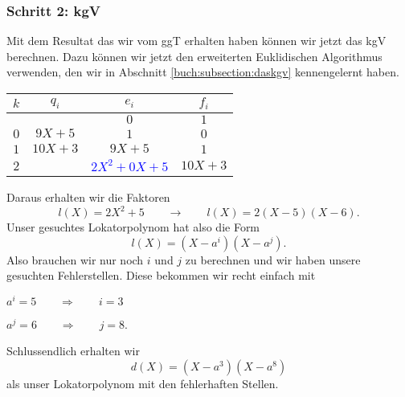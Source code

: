 \subsubsection{Schritt 2: kgV}

Mit dem Resultat das wir vom ggT erhalten haben können wir jetzt das kgV berechnen. Dazu können wir jetzt den erweiterten Euklidischen Algorithmus verwenden, den wir in Abschnitt \ref{buch:subsection:daskgv} kennengelernt haben.
%
%
\begin{center}
	
	\begin{tabular}{| c | c | c c |}
		\hline
		$k$ &  $q_i$ & $e_i$ & $f_i$\\
		\hline 
		& & $0$& $1$\\
		$0$& $9X + 5$& $1$& $0$\\
		$1$& $10X + 3$& $9X+5$& $1$\\
		$2$& & \textcolor{blue}{$2X^2 + 0X + 5$}& $10X + 3$\\
		\hline
	\end{tabular}	
	
\end{center}
Daraus erhalten wir die Faktoren
\[
l(X) = 2X^2 + 5 \qquad \rightarrow \qquad l(X) = 2(X-5)(X-6).
\]
Unser gesuchtes Lokatorpolynom hat also die Form
\[
l(X) = (X-a^i)(X-a^j).
\]
Also brauchen wir nur noch $i$ und $j$ zu berechnen und wir haben unsere gesuchten Fehlerstellen.
Diese bekommen wir recht einfach mit
\begin{center}
	$a^i = 5 \qquad \Rightarrow \qquad i = 3$
	
	$a^j = 6 \qquad \Rightarrow \qquad j = 8$.
\end{center}
Schlussendlich erhalten wir
\[
d(X) = (X-a^3)(X-a^8)
\]
als unser Lokatorpolynom mit den fehlerhaften Stellen.
